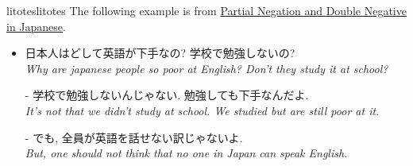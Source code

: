 \documentclass{article}
\begin{document}
\begin{example}{litotes}{litotes}
    The following example is from \href{https://www.wasabi-jpn.com/japanese-grammar/partial-negation-and-double-negative-in-japanese/}{Partial Negation and Double Negative in Japanese}.
    \begin{itemize}
        \item 日本人はどして英語が下手なの? 学校で勉強しないの? \\
        \textit{Why are japanese people so poor at English? Don't they study it at school?}
        \item[-] 学校で{\color{cyan}勉強しないんじゃない}. 勉強しても下手なんだよ.\\
        \textit{It's not that we didn't study at school. We studied but are still poor at it.}
        \item[-] でも, 全員が英語を{\color{cyan}話せない訳じゃない}よ.\\
        \textit{But, one should not think that no one in Japan can speak English.}
    \end{itemize}
\end{example}

% 
% 
\end{document}
